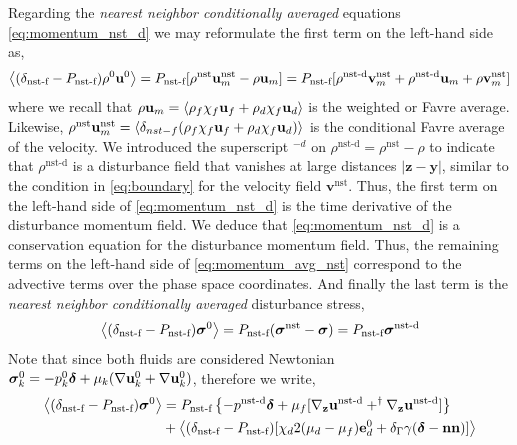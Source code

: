 Regarding the \textit{nearest neighbor conditionally averaged} equations \eqref{eq:momentum_nst_d} we may reformulate the first term on the left-hand side as, 
\begin{equation}
    \left<(\delta_\text{nst-f} - P_\text{nst-f})\rho^0 \textbf{u}^0\right>
    = P_\text{nst-f} [
        \rho^\text{nst}\textbf{u}_m^\text{nst}
        - 
        \rho \textbf{u}_m
    ]
    = P_\text{nst-f} [
        \rho^\text{nst-d}\textbf{v}^\text{nst}_m
        + \rho^\text{nst-d}\textbf{u}_m
        + \rho \textbf{v}^\text{nst}_m
    ]
\end{equation}
where we recall that $\rho \textbf{u}_m = \left<\rho_f\chi_f \textbf{u}_f + \rho_d\chi_f  \textbf{u}_d\right>$ is the weighted or Favre average.
Likewise, $\rho^\text{nst} \textbf{u}_m^\text{nst} = \left<\delta_{nst-f}(\rho_f\chi_f \textbf{u}_f + \rho_d\chi_f  \textbf{u}_d)\right>$ is the conditional Favre average of the velocity. 
We introduced the superscript $^{-d}$ on $\rho^\text{nst-d} = \rho^\text{nst} - \rho$ to indicate that $\rho^\text{nst-d}$ is a disturbance field that vanishes at large distances  $|\textbf{z} - \textbf{y}|$, similar to the condition in \ref{eq:boundary} for the velocity field $\textbf{v}^\text{nst}$. 
Thus, the first term on the left-hand side of \ref{eq:momentum_nst_d} is the time derivative of the disturbance momentum field. 
We deduce that \ref{eq:momentum_nst_d} is a conservation equation for the disturbance momentum field.
Thus, the remaining terms on the left-hand side of \ref{eq:momentum_avg_nst} correspond to the advective terms over the phase space coordinates.
And finally the last term is the \textit{nearest neighbor conditionally averaged} disturbance stress,  
\begin{equation}
    \left<(\delta_\text{nst-f} - P_\text{nst-f}) \bm\sigma^0\right>
    = P_\text{nst-f} (\bm\sigma^\text{nst} - \bm\sigma)
    = P_\text{nst-f} \bm\sigma^\text{nst-d}
\end{equation}
Note that since both fluids are considered Newtonian $\bm\sigma_k^0 = -p_k^0\bm\delta + \mu_k (\mathbf{\nabla} \textbf{u}_k^0 + \mathbf{\nabla} \textbf{u}_k^0)$, therefore we write,
\begin{align}
    \avg{(\delta_\text{nst-f} - P_\text{nst-f}) \bm\sigma^0}
    &=
    P_\text{nst-f}\left\{
        -p^\text{nst-d}\bm\delta 
        + \mu_f [\pddz \textbf{u}^\text{nst-d}+^\dagger\pddz \textbf{u}^\text{nst-d}]
    \right\}\nonumber\\
   &+  \avg{(\delta_\text{nst-f} - P_\text{nst-f})[
    \chi_d  2 (\mu_d-\mu_f)\textbf{e}_d^0 
    + \delta_\Gamma \gamma (\bm\delta - \textbf{nn})]
    }
    \label{eq:stress_nst}
\end{align}
